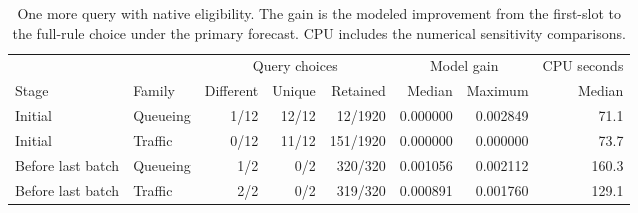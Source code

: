 \begin{table}[htbp]\centering
\caption{One more query with native eligibility. The gain is the modeled improvement from
the first-slot to the full-rule choice under the primary forecast. CPU includes the numerical
sensitivity comparisons.}\label{tab:eligible_query}
\small\begin{tabular}{llrrrrrr}\toprule
& & \multicolumn{3}{c}{Query choices} & \multicolumn{2}{c}{Model gain} & CPU seconds \\
Stage & Family & Different & Unique & Retained & Median & Maximum & Median \\
\midrule
Initial & Queueing & 1/12 & 12/12 & 12/1920 & 0.000000 & 0.002849 & 71.1 \\
Initial & Traffic & 0/12 & 11/12 & 151/1920 & 0.000000 & 0.000000 & 73.7 \\
Before last batch & Queueing & 1/2 & 0/2 & 320/320 & 0.001056 & 0.002112 & 160.3 \\
Before last batch & Traffic & 2/2 & 0/2 & 319/320 & 0.000891 & 0.001760 & 129.1 \\
\bottomrule\end{tabular}
\end{table}
